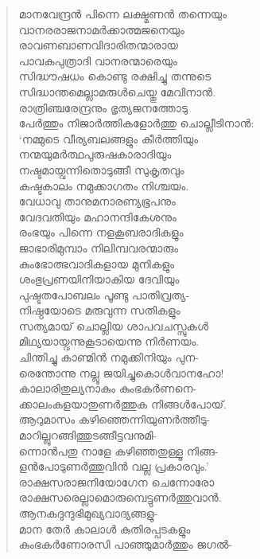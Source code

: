 \begin{verse}
മാനവേന്ദ്രന്‍ പിന്നെ ലക്ഷ്മണന്‍ തന്നെയും\\
വാനരരാജനാമര്‍ക്കാത്മജനെയും\\
രാവണബാണവിദാരിതന്മാരായ\\
പാവകപുത്രാദി വാനരന്മാരെയും\\
സിദ്ധൗഷധം കൊണ്ടു രക്ഷിച്ചു തന്നുടെ\\
സിദ്ധാന്തമെല്ലാമരുള്‍ചെയ്തു മേവിനാന്‍.\\
രാത്രിഞ്ചരേന്ദ്രനും ഭൃത്യജനത്തോടു\\
പേര്‍ത്തും നിജാര്‍ത്തികളോര്‍ത്തു ചൊല്ലീടിനാന്‍:\\
‘നമ്മുടെ വീര്യബലങ്ങളും കീര്‍ത്തിയും\\
നന്മയുമര്‍ത്ഥപുരുഷകാരാദിയും\\
നഷ്ടമായ്വന്നിതൊടുങ്ങീ സുകൃതവും\\
കഷ്ടകാലം നമുക്കാഗതം നിശ്ചയം.\\
വേധാവു താനുമനാരണ്യഭൂപനും\\
വേദവതിയും മഹാനന്ദികേശനും\\
രംഭയും പിന്നെ നളകൂബരാദികളും\\
ജാഭാരിമുമ്പാം നിലിമ്പവരന്മാരും\\
കുംഭോത്ഭവാദികളായ മുനികളും\\
ശംഭുപ്രണയിനിയാകിയ ദേവിയും\\
പുഷ്ടതപോബലം പൂണ്ടു പാതിവ്രത്യ-\\
നിഷ്ഠയോടെ മരുവുന്ന സതികളും\\
സത്യമായ് ചൊല്ലിയ ശാപവചസ്സുകള്‍\\
മിഥ്യയായ്വന്നുകൂടായെന്നു നിര്‍ണയം.\\
ചിന്തിച്ചു കാണ്മിന്‍ നമുക്കിനിയും പുന-\\
രെന്തോന്നു നല്ലൂ ജയിച്ചുകൊള്‍വാനഹോ!\\
കാലാരിതുല്യനാകും കുംഭകര്‍ണനെ-\\
ക്കാലംകളയാതുണര്‍ത്തുക നിങ്ങള്‍പോയ്.\\
ആറുമാസം കഴിഞ്ഞെന്നിയുണര്‍ത്തീടു-\\
മാറില്ലുറങ്ങിത്തുടങ്ങീട്ടവനുമി-\\
ന്നൊന്‍പതു നാളേ കഴിഞ്ഞതുള്ളൂ നിങ്ങ-\\
ളന്‍പോടുണര്‍ത്തുവിന്‍ വല്ല പ്രകാരവും.’\\
രാക്ഷസരാജനിയോഗേന ചെന്നോരോ\\
രാക്ഷസരെല്ലാമൊരുമ്പെട്ടുണര്‍ത്തുവാന്‍.\\
ആനകദുന്ദുഭിമുഖ്യവാദ്യങ്ങളു-\\
മാന തേര്‍ കാലാള്‍ കുതിരപ്പടകളും\\
കുംഭകര്‍ണോരസി പാഞ്ഞുമാര്‍ത്തും ജഗല്‍-\\

\end{verse}
